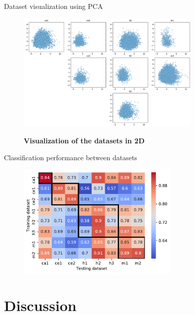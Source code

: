 \documentclass{beamer}
\begin{document}
\begin{frame}{Dataset visualization using PCA}
\begin{figure}[h!]
  \caption{\textbf{Visualization of the datasets in 2D}} 
       \includegraphics[width = 0.8\textwidth]{images/5_unite_features_pca_resample_scale=True_all.png}
      \label{fig:feature_pca}
      
      \end{figure}
\end{frame}

\begin{frame}{Classification performance between datasets}

\begin{figure}[h!]
      \includegraphics[width = 0.7\textwidth]{images/6_diff_summary.pdf}
    \label{fig:crossdataset}
    
      \end{figure}

\end{frame}

\section{Discussion}
\end{document}
